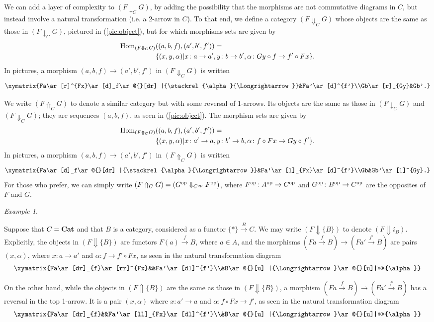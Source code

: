 \documentclass{amsart}
\makeatletter
\def\tn{\textnormal}
\def\Hom{\tn{Hom}}
\def\to{\rightarrow}
\def\taking{\colon}
\def\too{\longrightarrow}
\def\down{\downarrow}
\def\Down{\Downarrow}
\def\Up{\Uparrow}
\def\op{^\tn{op}}
\newcommand{\To}[1]{\xrightarrow{#1}}
\def\Cat{{\bf Cat}}
\theoremstyle{remark}
\newtheorem{example}[theorem]{Example}
\theoremstyle{definition}
\newcommand{\TriRight}[7]{\xymatrix{#1\ar[dr]_{#2}\ar[rr]^{#3}&&#4\ar[dl]^{#5}\\&#6\ar@{}[u] |{\Longrightarrow}\ar@{}[u]|>>>>{#7}}}
\newcommand{\TriLeft}[7]{\xymatrix{#1\ar[dr]_{#2}&&#4\ar[ll]_{#3}\ar[dl]^{#5}\\&#6\ar@{}[u] |{\Longrightarrow}\ar@{}[u]|>>>>{#7}}}
\makeatother
\begin{document}
We can add a layer of complexity to $(F\down_C G)$, by adding the possibility that the morphisms are not commutative diagrams in $C$, but instead involve a natural transformation (i.e. a 2-arrow in $C$).  To that end, we define a category $(F\Down_C G)$ whose objects are the same as those in $(F\down_C G)$, pictured in (\ref{pic:object}), but for which morphisms sets are given by \begin{align*}\Hom_{(F\Down_C G)}&((a,b,f),(a',b',f'))=\\&\{(x,y,\alpha)|x\taking a\to a',y\taking b\to b',\alpha\taking Gy\circ f\to f'\circ Fx\}.\end{align*}  In pictures, a morphism $(a,b,f)\to (a',b',f')$ in $(F\Down_C G)$ is written $$\xymatrix{Fa\ar[r]^{Fx}\ar[d]_f\ar@{}[dr] |{\stackrel{\alpha}{\Longrightarrow}}&Fa'\ar[d]^{f'}\\Gb\ar[r]_{Gy}&Gb'.}$$

We write $(F\Up_C G)$ to denote a similar category but with some reversal of 1-arrows.  Its objects are the same as those in $(F\down_C G)$ and $(F\Down_C G)$; they are sequences $(a,b,f)$, as seen in (\ref{pic:object}).  The morphism sets are given by \begin{align*}\Hom_{(F\Up_C G)}&((a,b,f),(a',b',f'))=\\&\{(x,y,\alpha)|x\taking a'\to a,y\taking b'\to b,\alpha\taking f\circ Fx\to Gy\circ f'\}.\end{align*}  In pictures, a morphism $(a,b,f)\to (a',b',f')$ in $(F\Up_C G)$ is written $$\xymatrix{Fa\ar[d]_f\ar@{}[dr] |{\stackrel{\alpha}{\Longrightarrow}}&Fa'\ar[l]_{Fx}\ar[d]^{f'}\\Gb&Gb'\ar[l]^{Gy}.}$$  For those who prefer, we can simply write $(F\Up_C G)=(G\op\Down_{C\op}F\op)$, where $F\op\taking A\op\to C\op$ and $G\op\taking B\op\to C\op$ are the opposites of $F$ and $G$.

\begin{example}\label{ex:Down and Up}

Suppose that $C=\Cat$ and that $B$ is a category, considered as a functor $\{*\}\To{B}C$.  We may write $(F\Down\{B\})$ to denote $(F\Down i_B)$.  Explicitly, the objects in $(F\Down\{B\})$ are functors $F(a)\To{f} B$, where $a\in A$, and the morphisms $(Fa\To{f} B)\too (Fa'\To{f'} B)$ are pairs $(x,\alpha)$, where $x\taking a\to a'$ and $\alpha\taking f\to f'\circ Fx$, as seen in the natural transformation diagram $$\TriRight{Fa}{f}{Fx}{Fa'}{f'}{B}{\alpha}$$

On the other hand, while the objects in $(F\Up \{B\})$ are the same as those in $(F\Down\{B\})$, a morphism $(Fa\To{f} B)\too (Fa'\To{f'} B)$ has a reversal in the top 1-arrow.  It is a pair $(x,\alpha)$ where $x\taking a'\to a$ and $\alpha\taking f\circ Fx\to f'$, as seen in the natural transformation diagram $$\TriLeft{Fa}{f}{Fx}{Fa'}{f'}{B}{\alpha}$$

\end{example}
\end{document}
